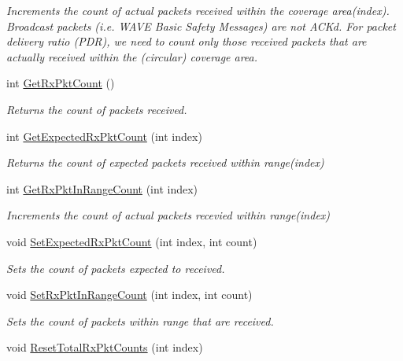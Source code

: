 \begin{DoxyCompactItemize}
\begin{DoxyCompactList}\small\item\em Increments the count of actual packets received within the coverage area(index). Broadcast packets (i.\+e. W\+A\+VE Basic Safety Messages) are not A\+CK\textquotesingle{}d. For packet delivery ratio (P\+DR), we need to count only those received packets that are actually received within the (circular) coverage area. \end{DoxyCompactList}\item 
int \hyperlink{classns3_1_1WaveBsmStats_a1cff6d6ff98af2f7fd8f0b1f9f86d225}{Get\+Rx\+Pkt\+Count} ()
\begin{DoxyCompactList}\small\item\em Returns the count of packets received. \end{DoxyCompactList}\item 
int \hyperlink{classns3_1_1WaveBsmStats_a885a476017e4a42ac6f95a05e6e96a94}{Get\+Expected\+Rx\+Pkt\+Count} (int index)
\begin{DoxyCompactList}\small\item\em Returns the count of expected packets received within range(index) \end{DoxyCompactList}\item 
int \hyperlink{classns3_1_1WaveBsmStats_a9bd1aa34f90c050b57d3650884c2f928}{Get\+Rx\+Pkt\+In\+Range\+Count} (int index)
\begin{DoxyCompactList}\small\item\em Increments the count of actual packets recevied within range(index) \end{DoxyCompactList}\item 
void \hyperlink{classns3_1_1WaveBsmStats_a1100ccdf1e81af8b4a6e30429217562a}{Set\+Expected\+Rx\+Pkt\+Count} (int index, int count)
\begin{DoxyCompactList}\small\item\em Sets the count of packets expected to received. \end{DoxyCompactList}\item 
void \hyperlink{classns3_1_1WaveBsmStats_af8124cdd935ff38eaf228c930acb9bfb}{Set\+Rx\+Pkt\+In\+Range\+Count} (int index, int count)
\begin{DoxyCompactList}\small\item\em Sets the count of packets within range that are received. \end{DoxyCompactList}\item 
void \hyperlink{classns3_1_1WaveBsmStats_af82437714b4f78a5f32bb55f8c36f853}{Reset\+Total\+Rx\+Pkt\+Counts} (int index)

\end{DoxyCompactItemize}
